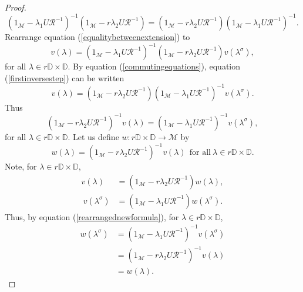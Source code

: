 \documentclass[12pt,reqno]{amsart}
\numberwithin{equation}{section}
\theoremstyle{definition}
\begin{document}
\begin{proof}
\begin{equation}\label{commutingequations}
(1_{\mathcal{M}}-\lambda_{1}U\mathcal{R}^{-1})^{-1}(1_{\mathcal{M}}-r\lambda_{2}U\mathcal{R}^{-1}) = (1_{\mathcal{M}}-r\lambda_{2}U\mathcal{R}^{-1})(1_{\mathcal{M}}-\lambda_{1}U\mathcal{R}^{-1})^{-1}.
\end{equation}
Rearrange equation (\ref{equalitybetweenextension}) to
\begin{equation}\label{firstinversestep}
v({\lambda}) = (1_{\mathcal{M}}-\lambda_{1}U\mathcal{R}^{-1})^{-1}(1_{\mathcal{M}}-r\lambda_{2}U\mathcal{R}^{-1})v({\lambda}^{\sigma}),
\end{equation}
for all $\lambda \in r\mathbb{D}\times\mathbb{D}$.
By equation (\ref{commutingequations}), equation (\ref{firstinversestep}) can be written
\begin{equation}\label{rearrangednewformula-1}
 v({\lambda}) =  (1_{\mathcal{M}}-r\lambda_{2}U\mathcal{R}^{-1})(1_{\mathcal{M}}-\lambda_{1}U\mathcal{R}^{-1})^{-1}v({\lambda}^{\sigma}).
\end{equation}
Thus
\begin{equation}\label{rearrangednewformula}
 (1_{\mathcal{M}}-r\lambda_{2}U\mathcal{R}^{-1})^{-1}v({\lambda}) = (1_{\mathcal{M}}-\lambda_{1}U\mathcal{R}^{-1})^{-1}v({\lambda}^{\sigma}),
\end{equation}
for all $\lambda \in r\mathbb{D}\times\mathbb{D}$.
Let us define $w: r\mathbb{D}\times\mathbb{D}\rightarrow \mathcal{M}$ by
\begin{equation}\label{wequation}
w(\lambda)=(1_{\mathcal{M}}-r\lambda_{2}U\mathcal{R}^{-1})^{-1}v({\lambda})~~\text{for all}~\lambda \in r\mathbb{D}\times \mathbb{D}.
\end{equation}
Note, for $\lambda \in r \mathbb{D}\times\mathbb{D}$,
\begin{align}
v({\lambda}) &= (1_{\mathcal{M}}-r\lambda_{2}U\mathcal{R}^{-1})w(\lambda) \label{vlambda},\\
~v({\lambda}^{\sigma}) &= (1_{\mathcal{M}}-\lambda_{1}U\mathcal{R}^{-1})w(\lambda^{\sigma}) \label{vlambdasigma}.
\end{align}
Thus, by equation (\ref{rearrangednewformula}), for $\lambda \in r \mathbb{D} \times \mathbb{D}$,
\begin{align}
w({\lambda^{\sigma}}) &= (1_{\mathcal{M}}-\lambda_{1}U\mathcal{R}^{-1})^{-1}v({\lambda}^{\sigma}) \nonumber \\
& =  (1_{\mathcal{M}}-r\lambda_{2}U\mathcal{R}^{-1})^{-1}v({\lambda}) \nonumber \\
& = w(\lambda). \label{wsigma}

\end{align}
\end{proof}
\end{document}
